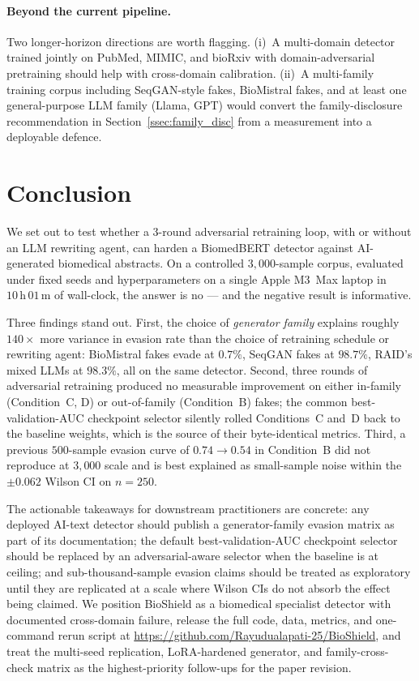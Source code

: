 \documentclass[conference]{IEEEtran}
\begin{document}
\paragraph{Beyond the current pipeline.}
Two longer-horizon directions are worth flagging. (i)~A multi-domain
detector trained jointly on PubMed, MIMIC, and bioRxiv with
domain-adversarial pretraining \cite{ganin2016dann} should help with
cross-domain calibration. (ii)~A multi-family training corpus including
SeqGAN-style fakes, BioMistral fakes, and at least one general-purpose
LLM family (Llama, GPT) would convert the family-disclosure
recommendation in Section~\ref{ssec:family_disc} from a measurement
into a deployable defence.

\section{Conclusion}
\label{sec:conclusion}

We set out to test whether a 3-round adversarial retraining loop, with
or without an LLM rewriting agent, can harden a BiomedBERT detector
against AI-generated biomedical abstracts. On a controlled
\(3{,}000\)-sample corpus, evaluated under fixed seeds and
hyperparameters on a single Apple M3~Max laptop in
\(10\,\mathrm{h}\,01\,\mathrm{m}\) of wall-clock, the answer is no — and
the negative result is informative.

Three findings stand out. First, the choice of \emph{generator family}
explains roughly \(140\times\) more variance in evasion rate than the
choice of retraining schedule or rewriting agent: BioMistral fakes evade
at \(0.7\%\), SeqGAN fakes at \(98.7\%\), RAID's mixed LLMs at
\(98.3\%\), all on the same detector. Second, three rounds of
adversarial retraining produced no measurable improvement on either
in-family (Condition~C, D) or out-of-family (Condition~B) fakes; the
common best-validation-AUC checkpoint selector silently rolled
Conditions~C and~D back to the baseline weights, which is the source of
their byte-identical metrics. Third, a previous \(500\)-sample evasion
curve of \(0.74 \to 0.54\) in Condition~B did not reproduce at
\(3{,}000\) scale and is best explained as small-sample noise within the
\(\pm 0.062\) Wilson CI on \(n = 250\).

The actionable takeaways for downstream practitioners are concrete: any
deployed AI-text detector should publish a
generator-family evasion matrix as part of its documentation; the
default best-validation-AUC checkpoint selector should be replaced by an
adversarial-aware selector when the baseline is at ceiling; and
sub-thousand-sample evasion claims should be treated as exploratory
until they are replicated at a scale where Wilson CIs do not absorb the
effect being claimed. We position BioShield as a biomedical specialist
detector with documented cross-domain failure, release the full code,
data, metrics, and one-command rerun script at
\url{https://github.com/Rayudualapati-25/BioShield}, and treat the
multi-seed replication, LoRA-hardened generator, and family-cross-check
matrix as the highest-priority follow-ups for the paper revision.
\end{document}
